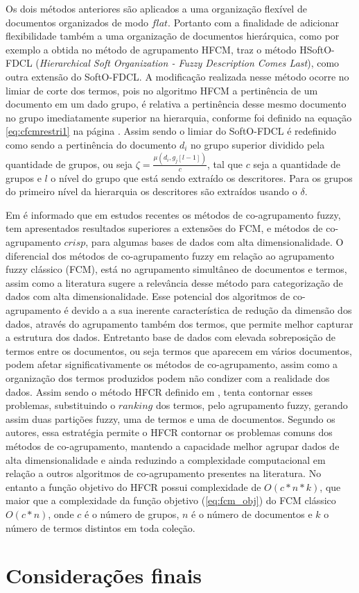 Os dois métodos anteriores são aplicados a uma organização flexível de documentos organizados de
modo $flat$. Portanto com a finalidade de adicionar flexibilidade também a uma organização de
documentos hierárquica, como por exemplo a obtida no método de
agrupamento HFCM, \cite{Nogueira2013} traz o método HSoftO-FDCL (\textit{Hierarchical Soft
Organization - Fuzzy Description Comes Last\/}), como outra extensão do SoftO-FDCL. 
A modificação realizada nesse método ocorre no limiar de corte dos termos, pois no algoritmo HFCM a
pertinência de um documento em um dado grupo, é relativa a pertinência desse mesmo documento no
grupo imediatamente superior na hierarquia, conforme foi definido na equação \ref{eq:cfcmrestri1} na
página \pageref{eq:cfcmrestri1}. Assim sendo o limiar do SoftO-FDCL é redefinido como
sendo a pertinência do documento $d_i$ no grupo superior dividido pela quantidade de grupos, ou seja
$\zeta = \frac{\mu(d_i,g_j[l-1])}{c}$, tal que $c$ seja a quantidade de grupos e $l$ o nível do
grupo que está sendo extraído os descritores. Para os grupos do primeiro nível da hierarquia os
descritores são extraídos usando o $\delta$. 


Em \cite{Yan2013} é informado que em estudos recentes os métodos de co-agrupamento fuzzy,
tem apresentados resultados superiores a extensões do FCM, e métodos de co-agrupamento $crisp$, para
algumas bases de dados com alta dimensionalidade. O diferencial dos métodos de co-agrupamento fuzzy 
em relação ao agrupamento fuzzy clássico (FCM), está no agrupamento simultâneo de documentos e
termos, assim como a literatura sugere a relevância desse método para categorização de dados com
alta dimensionalidade\cite{Yan2013}. Esse potencial dos algoritmos de co-agrupamento é devido a
a sua inerente característica de redução da dimensão dos dados, através do agrupamento também dos
termos, que permite melhor capturar a estrutura dos dados. Entretanto base de dados com elevada
sobreposição de termos entre os documentos, ou seja termos que aparecem em vários documentos, podem
afetar significativamente os métodos de co-agrupamento, assim como a organização dos termos
produzidos podem não condizer com a realidade dos dados\cite{Tjhi2008}. Assim sendo o método HFCR
definido em \cite{Tjhi2008}, tenta contornar esses problemas, substituindo o $ranking$ dos termos,
pelo agrupamento fuzzy, gerando assim duas partições fuzzy, uma de termos e uma de documentos.
Segundo os autores, essa estratégia permite o HFCR contornar os problemas comuns dos métodos de
co-agrupamento, mantendo a capacidade melhor agrupar dados de alta dimensionalidade e ainda
reduzindo a complexidade computacional em relação a outros algoritmos de co-agrupamento presentes na
literatura. No entanto a função objetivo do HFCR possui complexidade de $O(c*n*k)$, que maior que a
complexidade da função objetivo (\ref{eq:fcm_obj}) do FCM clássico $O(c*n)$, onde $c$ é o número de
grupos, $n$ é o número de documentos e $k$ o número de termos distintos em toda coleção.
 
\section{Considerações finais}
